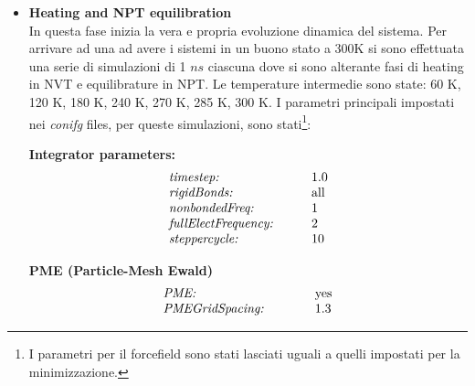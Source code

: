 \begin{itemize}
\item \textbf{Heating and NPT equilibration}\\
In questa fase inizia la vera e propria evoluzione dinamica del sistema. Per arrivare ad una ad avere i sistemi in un buono stato a 300K si sono effettuata una serie di simulazioni di 1 $ns$ ciascuna dove si sono alterante fasi di heating in NVT e equilibrature in NPT. Le temperature intermedie sono state: 60 K, 120 K, 180 K, 240 K, 270 K, 285 K, 300 K. I parametri principali impostati nei \textit{conifg} files, per queste simulazioni, sono stati\footnote{I parametri per il forcefield sono stati lasciati uguali a quelli impostati per la minimizzazione.}:
\begin{center}
\begin{minipage}{0.45\textwidth}
\begin{center}
\textbf{Integrator parameters:}
\vspace{-0.25cm}
\begin{equation*}
\begin{array}{ll}
\text{\textit{timestep:}} \qquad\quad &1.0\\
\text{\textit{rigidBonds:}} \qquad\quad & \text{all}\\
\text{\textit{nonbondedFreq:}} \qquad\quad & 1\\
\text{\textit{fullElectFrequency:}} \qquad & 2\\
\text{\textit{steppercycle:}} \qquad & 10\\
\end{array}
\end{equation*}
\end{center}
\end{minipage}
\begin{minipage}{0.45\textwidth}
\begin{center}
\vspace{-1.55cm}
\textbf{PME (Particle-Mesh Ewald)}
\vspace{-0.25cm}
\begin{equation*}
\begin{array}{ll}
\text{\textit{PME:}} \qquad\quad & \text{yes}\\
\text{\textit{PMEGridSpacing:}} \qquad\quad & 1.3\\
\end{array}
\end{equation*}
\end{center}
\end{minipage}
\end{center}


\end{itemize}
